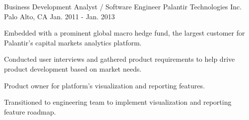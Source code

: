 \begin{cventries}
  \cventry
    {Business Development Analyst / Software Engineer} %
    {Palantir Technologies Inc.} %
    {Palo Alto, CA} %
    {Jan. 2011 - Jan. 2013} %
    {
      \begin{cvitems} %
        \item {Embedded with a prominent global macro hedge fund, the largest customer for Palantir's capital markets analytics platform.}
        \item {Conducted user interviews and gathered product requirements to help drive product development based on market needs.}
        \item {Product owner for platform's visualization and reporting features.}
        \item {Transitioned to engineering team to implement visualization and reporting feature roadmap.}
      \end{cvitems}
    }

\end{cventries}
